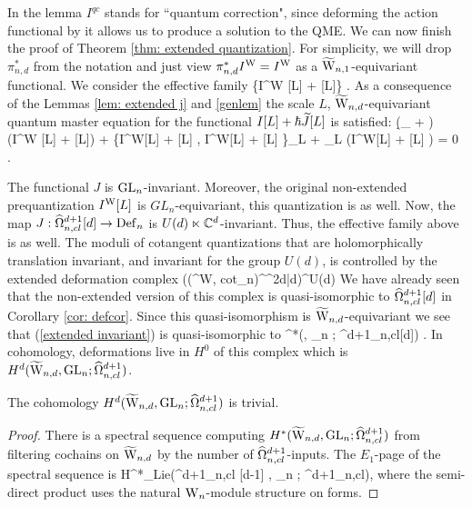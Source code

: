 \documentclass[10pt]{amsart}
\begin{document}
In the lemma $I^{qc}$ stands for ``quantum correction", since deforming the action functional by it allows us to produce a solution to the QME.
We can now finish the proof of Theorem \ref{thm: extended quantization}.
For simplicity, we will drop $\pi_{n,d}^*$ from the notation and just view $\pi^*_{n,d} I^{\rm W} = I^{\rm W}$ as a $\TVect$-equivariant functional. 
We consider the effective family 
\ben
\{I^{\rm W} [L] + \hbar {}[L]\} .
\een
As a consequence of the Lemmas \ref{lem: extended j} and \ref{genlem} the scale $L$, $\TVectd$-equivariant quantum master equation for the functional $I[L] + \hbar \Tilde{J}[L]$ is satisfied:
\ben
(\d_{} + \dbar) (I^{\rm W} [L] + \hbar {}[L]) + 
\{I^{\rm W}[L] + \hbar {}[L] , I^{\rm W}[L] + \hbar
{}[L] \}_L + \hbar \Delta_L (I^{\rm W}[L] + \hbar {}[L] ) = 0 .
\een 

The functional $J$ is $\GL_n$-invariant.
Moreover, the original non-extended prequantization $I^{\rm W}[L]$ is $GL_n$-equivariant, this quantization is as well.
Now, the map $J : \hOmega^{d+1}_{n,cl}[d] \to \Def_n$ is $U(d) \ltimes \CC^d$-invariant.
Thus, the effective family above is as well. 
The moduli of cotangent quantizations that are holomorphically translation invariant, and invariant for the group $U(d)$, is controlled by the extended deformation complex 
\be\label{extended invariant}
\left(\left(\Tilde{\Def}^{\rm W, cot}_n\right)^{\CC^{2d|d}}\right)^{U(d)}
\ee
We have already seen that the non-extended version of this complex is quasi-isomorphic to $\hOmega^{d+1}_{n,cl}[d]$ in Corollary \ref{cor: defcor}.
Since this quasi-isomorphism is $\TVectd$-equivariant we see that (\ref{extended invariant}) is quasi-isomorphic to 
\ben
\clie^*(\TVectd , \GL_n ; \hOmega^{d+1}_{n,cl}[d]) .
\een
In cohomology, deformations live in $H^0$ of this complex which is $H^{d}(\TVectd , \GL_n ; \hOmega^{d+1}_{n,cl})$.

\begin{lem}
The cohomology $H^{d}(\TVectd , \GL_n ; \hOmega^{d+1}_{n,cl})$ is trivial.
\end{lem}
\begin{proof}
There is a spectral sequence computing $H^{*}(\TVectd , \GL_n ; \hOmega^{d+1}_{n,cl})$ from filtering cochains on $\TVectd$ by the number of $\hOmega^{d+1}_{n,cl}$-inputs.
The $E_1$-page of the spectral sequence is 
\ben
H^{*}_{\rm Lie}(\Vect \ltimes \hOmega^{d+1}_{n,cl} [d-1] , \GL_n ; \hOmega^{d+1}_{n,cl}),
\een
where the semi-direct product uses the natural $\Vect$-module structure on forms.

\end{proof}
\end{document}
